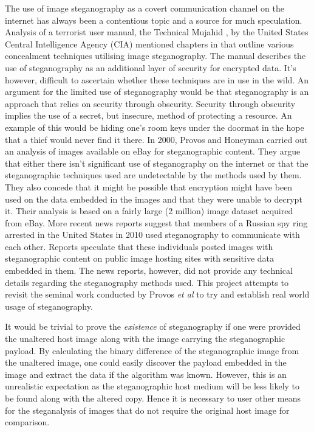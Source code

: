 \par The use of image steganography as a covert communication channel on the internet has always been a contentious topic and a source for much speculation. Analysis of a terrorist user manual, the Technical Mujahid \cite{alfajr}, by the United States Central Intelligence Agency (CIA) mentioned chapters in that outline various concealment techniques utilising image steganography. The manual describes the use of steganography as an additional layer of security for encrypted data. It's however, difficult to ascertain whether these techniques are in use in the wild. An argument for the limited use of steganography would be that steganography is an approach that relies on security through obscurity. Security through obscurity implies the use of a secret, but insecure, method of protecting a resource. An example of this would be hiding one's room keys under the doormat in the hope that a thief would never find it there. In 2000, Provos and Honeyman \cite{provos2001detecting}  carried out an analysis of images available on eBay for steganographic content.  They argue that either there isn't  significant use of steganography on the internet or that the steganographic techniques used are undetectable by the methods used by them. They also concede that it might be possible that encryption might have been used on the data embedded in the images and that they were unable to decrypt it. Their analysis is based on a fairly large (2 million) image dataset acquired from eBay.   More recent news reports  \cite{spies2010} suggest that members of a Russian spy ring arrested in the United States in 2010 used steganography to communicate with each other. Reports speculate that these individuals posted images with steganographic content on public image hosting sites with sensitive data embedded in them. The news reports, however, did not provide any technical details regarding the steganography methods used. This project attempts to revisit the seminal work conducted by Provos \emph{et al} to try and establish real world usage of steganography.

It would be trivial to prove the \emph{existence} of steganography if one were provided the unaltered host image along with the image carrying the steganographic payload. By calculating the binary difference of the steganographic image from the unaltered image, one could easily discover the payload embedded in the image and extract the data if the algorithm was known. However, this is an unrealistic expectation as the steganographic host medium will be less likely to be found along with the altered copy. Hence it is necessary to user other means for the steganalysis of images that do not require the original host image for comparison.


